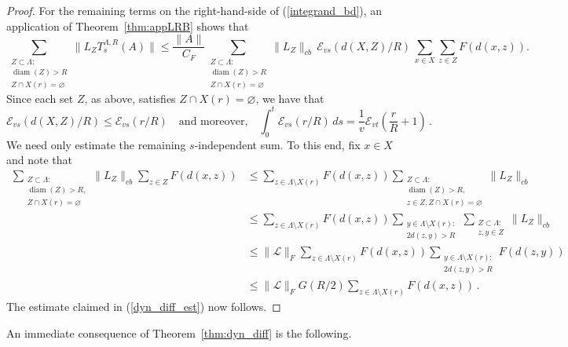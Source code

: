 \documentclass{article}
\DeclareMathOperator{\diam}{diam}
\newcommand{\E}{\mathscr{E}}
\newcommand{\<}{\langle}
\renewcommand{\>}{\rangle}
\let\emptyset\varnothing
\numberwithin{equation}{section}
\theoremstyle{definition}
\begin{document}
\begin{proof}
For the remaining terms on the right-hand-side of (\ref{integrand_bd}), an application of Theorem~\ref{thm:appLRB} shows that 
    \[
        \sum_{\substack{Z\subset \Lambda:\\ \diam(Z)> R\\ Z\cap X(r)=\emptyset}} \|L_ZT^{\Lambda, R}_s(A)\| \le \frac{\|A\|}{C_F} \sum_{\substack{Z\subset \Lambda:\\ \diam(Z)> R\\ Z\cap X(r) = \emptyset}} \|L_Z\|_{cb} \, \E_{vs}(d(X,Z)/R) \, \sum_{x\in X} \sum_{z \in Z}F(d(x,z)). 
    \]  
Since each set $Z$, as above, satisfies $Z \cap X(r) = \emptyset$, we have that 
\begin{equation}
\E_{vs}(d(X,Z)/R) \leq \E_{vs}(r/R) \quad \mbox{and moreover,} \quad \int_0^t \E_{vs}(r/R) \, ds = \frac{1}{v} \E_{vt} \left(\frac{r}{R} +1 \right) \, .
\end{equation}    
We need only estimate the remaining $s$-independent sum. To this end, fix $x \in X$ and note that
        \begin{align*}
            \sum_{\substack{Z\subset \Lambda:\\ \diam(Z)> R,\\ Z\cap X(r) = \emptyset}} \|L_Z\|_{cb} \sum_{z \in Z} F(d(x,z)) &\le \sum_{z\in \Lambda \setminus X(r)} F(d(x,z)) 
            \sum_{\substack{Z \subset \Lambda: \\ \diam(Z) >R, \\ z \in Z, Z \cap X(r) = \emptyset} }\| L_Z \|_{cb} \\
            & \le  \sum_{z\in \Lambda \setminus X(r)} F(d(x,z))    \sum_{\substack{y\in \Lambda \setminus X(r):\\ 2d(z,y)>R}}  \sum_{\substack{Z \subset \Lambda:\\ z,y \in Z}}\|L_Z\|_{cb}\\
            &\le \|\mathscr{L}\|_F \sum_{z\in \Lambda \setminus X(r)}  F(d(x,z))  \sum_{\substack{y\in \Lambda \setminus X(r):\\ 2d(z,y)>R}} F(d(z,y))\\
            &\le \| \mathscr{L}\|_F G(R/2) \sum_{z\in \Lambda \setminus X(r)} F(d(x,z)) \, .
        \end{align*} 
The estimate claimed in (\ref{dyn_diff_est}) now follows. 
\end{proof} 

%

An immediate consequence of Theorem~\ref{thm:dyn_diff} is the following. 
\end{document}
